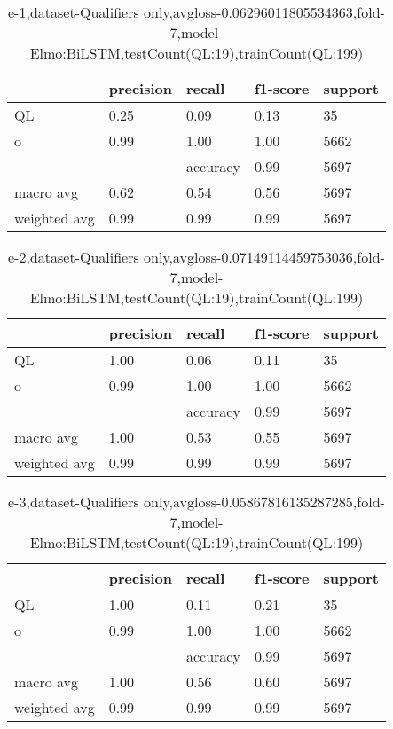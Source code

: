 \begin{table}[!ht] 
\centering
\caption{e-1,dataset-Qualifiers only,avgloss-0.06296011805534363,fold-7,model-Elmo:BiLSTM,testCount(QL:19),trainCount(QL:199)}\label{e-1data-qualS.tsv}
\begin{tabularx}{300pt}{|X|X|X|X|X|}
\hline
&precision&recall&f1-score&support\\
\hline
QL&0.25&0.09&0.13&35\\
\hline
o&0.99&1.00&1.00&5662\\
\hline
&&accuracy&0.99&5697\\
\hline
macro avg&0.62&0.54&0.56&5697\\
\hline
weighted avg&0.99&0.99&0.99&5697\\
\hline
\end{tabularx}
\end{table}
\begin{table}[!ht] 
\centering
\caption{e-2,dataset-Qualifiers only,avgloss-0.07149114459753036,fold-7,model-Elmo:BiLSTM,testCount(QL:19),trainCount(QL:199)}\label{e-2data-qualS.tsv}
\begin{tabularx}{300pt}{|X|X|X|X|X|}
\hline
&precision&recall&f1-score&support\\
\hline
QL&1.00&0.06&0.11&35\\
\hline
o&0.99&1.00&1.00&5662\\
\hline
&&accuracy&0.99&5697\\
\hline
macro avg&1.00&0.53&0.55&5697\\
\hline
weighted avg&0.99&0.99&0.99&5697\\
\hline
\end{tabularx}
\end{table}
\begin{table}[!ht] 
\centering
\caption{e-3,dataset-Qualifiers only,avgloss-0.05867816135287285,fold-7,model-Elmo:BiLSTM,testCount(QL:19),trainCount(QL:199)}\label{e-3data-qualS.tsv}
\begin{tabularx}{300pt}{|X|X|X|X|X|}
\hline
&precision&recall&f1-score&support\\
\hline
QL&1.00&0.11&0.21&35\\
\hline
o&0.99&1.00&1.00&5662\\
\hline
&&accuracy&0.99&5697\\
\hline
macro avg&1.00&0.56&0.60&5697\\
\hline
weighted avg&0.99&0.99&0.99&5697\\
\hline
\end{tabularx}
\end{table}
